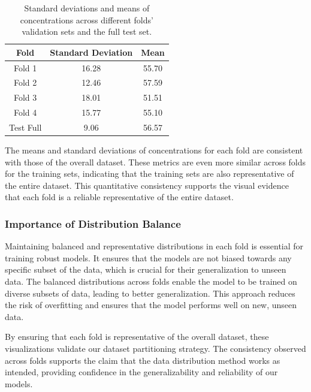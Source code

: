 \begin{table}[h!]
    \centering
    \begin{tabular}{|c|c|c|}
        \hline
        \textbf{Fold} & \textbf{Standard Deviation} & \textbf{Mean} \\
        \hline
        Fold 1 & 16.28 & 55.70 \\
        \hline
        Fold 2 & 12.46 & 57.59 \\
        \hline
        Fold 3 & 18.01 & 51.51 \\
        \hline
        Fold 4 & 15.77 & 55.10 \\
        \hline
        Test Full & 9.06 & 56.57 \\
        \hline
    \end{tabular}
    \caption{Standard deviations and means of  concentrations across different folds' validation sets and the full test set.}
    \label{tab:siO2_std_means}
\end{table}

The means and standard deviations of  concentrations for each fold are consistent with those of the overall dataset.
These metrics are even more similar across folds for the training sets, indicating that the training sets are also representative of the entire dataset.
This quantitative consistency supports the visual evidence that each fold is a reliable representative of the entire dataset.

\subsubsection{Importance of Distribution Balance}
Maintaining balanced and representative distributions in each fold is essential for training robust models.
It ensures that the models are not biased towards any specific subset of the data, which is crucial for their generalization to unseen data.
The balanced distributions across folds enable the model to be trained on diverse subsets of data, leading to better generalization.
This approach reduces the risk of overfitting and ensures that the model performs well on new, unseen data.

By ensuring that each fold is representative of the overall dataset, these visualizations validate our dataset partitioning strategy.
The consistency observed across folds supports the claim that the data distribution method works as intended, providing confidence in the generalizability and reliability of our models.


